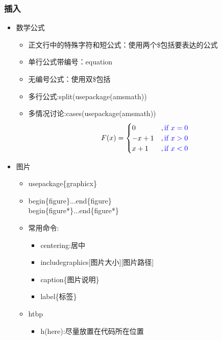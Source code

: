 \documentclass[a4paper,12pt]{article}
\begin{document}
\subsubsection{\color{green}插入}
\begin{itemize}
    \item 数学公式
          \begin{itemize}
              \item 正文行中的特殊字符和短公式：使用两个\$包括要表达的公式
              \item 单行公式带编号：equation
              \item 无编号公式：使用双\$包括
              \item 多行公式:split(usepackage(amsmath))
              \item 多情况讨论:cases(usepackage(amsmath))
              \begin{equation}
                F(x)=
                \begin{cases}
                    0&,\color{blue}\text{if $x=0$}\\
                    -x+1&, \color{blue}\text{if $x>0$}\\
                    x+1&, \color{blue}\text{if $x<0$}
                \end{cases}
              \end{equation}
          \end{itemize}
    \item 图片
          \begin{itemize}
              \item usepackage\{graphicx\}
              \item begin\{figure\}...end\{figure\}\\begin\{figure*\}...end\{figure*\}
              \item 常用命令:
                    \begin{itemize}
                        \item centering:居中
                        \item includegraphics[图片大小][图片路径]
                        \item caption\{图片说明\}
                        \item label\{标签\}
                    \end{itemize}
              \item htbp
                    \begin{itemize}
                        \item h(here):尽量放置在代码所在位置

\end{itemize}
\end{itemize}
\end{itemize}
\end{document}
